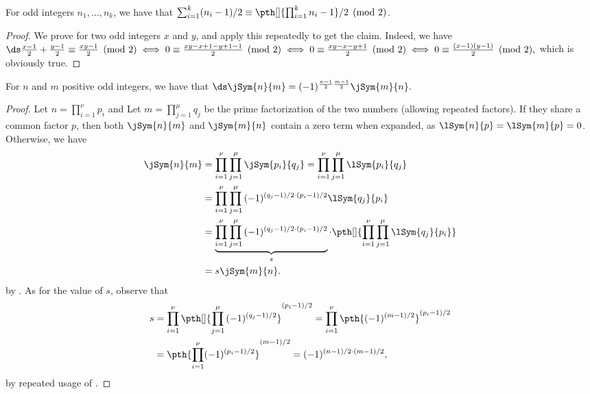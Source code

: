 
\begin{claim}
    For odd integers $n_1, \ldots, n_k$, we have that 
    $\sum_{i=1}^k (n_i -1)/2 \equiv \pth[]{\prod_{i=1}^k n_i -1} /2
    \pmod{2}$. 
\end{claim}
\begin{proof}
    We prove for two odd integers $x$ and $y$, and apply this
    repeatedly to get the claim. Indeed, we have
    \begin{math}
        \ds \frac{x-1}{2} + \frac{y-1}{2} \equiv \frac{xy - 1}{2}
        \pmod{2} \iff%
        0 \equiv \frac{xy -x + 1 -y + 1 - 1}{2} \pmod{2} \iff%
        0 \equiv \frac{xy -x -y + 1}{2} \pmod{2} \iff 0 \equiv
        \frac{(x-1)(y-1)}{2} \pmod{2},
    \end{math}
    which is obviously true.
\end{proof}

\begin{lemma}
    For $n$ and $m$ positive odd integers, we have that 
    \begin{math}
        \ds \jSym{n}{m} = (-1)^{\frac{n-1}{2} \frac{m-1}{2}}
        \jSym{m}{n}.
    \end{math}    
\end{lemma}

\begin{proof}
    Let $n = \prod_{i=1}^\nu p_i$ and Let $m = \prod_{j=1}^\mu q_j$ be
    the prime factorization of the two numbers (allowing repeated
    factors).  If they share a common factor $p$, then both
    $\jSym{n}{m}$ and $\jSym{m}{n}$ contain a zero term when expanded,
    as $\lSym{n}{p} = \lSym{m}{p} = 0$.  Otherwise, we have 
    \begin{align*}
        \jSym{n}{m}%
        &=%
        \prod_{i=1}^\nu \prod_{j=1}^\mu \jSym{p_i}{ q_j}%
        =%
        \prod_{i=1}^\nu \prod_{j=1}^\mu \lSym{p_i}{ q_j}\\
        &=%
        \prod_{i=1}^\nu \prod_{j=1}^\mu { (-1)^{(q_j-1)/2 \cdot (p_i
              -1 )/2}} \lSym{q_j}{p_i}%
        \\&%
        =%
        \underbrace{{\prod_{i=1}^\nu \prod_{j=1}^\mu { (-1)^{(q_j-1)/2
                    \cdot (p_i -1 )/2}}}}_{s} \cdot \pth[]{
           \prod_{i=1}^\nu \prod_{j=1}^\mu \lSym{q_j}{p_i}}\\
        &=%
        s  
        \jSym{m}{n}.
    \end{align*}
    by . As for the value of $s$, observe that 
    \begin{align*}
        s%
        &=%
        \prod_{i=1}^\nu \pth[]{ \prod_{j=1}^\mu { (-1)^{(q_j-1)/2}}}^{
           (p_i -1 )/2}%
        =%
        \prod_{i=1}^\nu \pth{ (-1)^{(m-1)/2}}^{ (p_i -1 )/2}\\
        &=%
        \pth{\prod_{i=1}^\nu (-1)^{ (p_i -1 )/2}}^ {(m-1)/2}
        =%
        (-1)^{(n-1)/2 \cdot (m-1)/2},
    \end{align*}
    by repeated usage of .
\end{proof}

